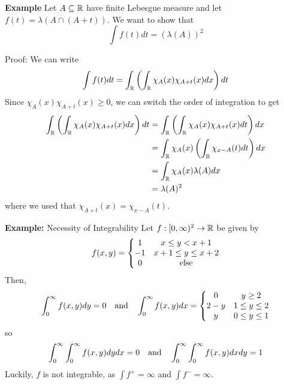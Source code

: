 \begin{example}{\textbf{Example}}
    Let $A \subseteq \R$ have finite Lebesgue measure and let $f(t) = \lambda(A \cap (A + t))$. We want to show that
    \[ \int f(t) dt = (\lambda(A))^2 \]
\end{example}
\begin{solution}{Proof:}
    We can write
    \[ \int f(t) dt = \int_{\R} \left(\int_{\R} \chi_{A}(x)\chi_{A + t}(x) dx\right) dt \]
    Since $\chi_{A}(x)\chi_{A + t}(x) \geq 0$, we can switch the order of integration to get
    \begin{align*}
        \int_{\R} \left(\int_{\R} \chi_{A}(x)\chi_{A + t}(x) dx\right) dt &= \int_{\R} \left(\int_{\R} \chi_{A}(x)\chi_{A + t}(x) dt\right) dx\\
        &= \int_{\R} \chi_{A}(x)\left(\int_{\R} \chi_{x - A}(t) dt\right) dx\\
        &= \int_{\R} \chi_{A}(x)\lambda(A) dx\\
        &= \lambda(A)^2
    \end{align*}
    where we used that $\chi_{A + t}(x) = \chi_{x - A}(t)$. 
\end{solution}

\begin{example}{\textbf{Example:} Necessity of Integrability}
    Let $f : [0, \infty)^2 \to \R$ be given by
    \[ f(x, y) = \left\{\begin{matrix} 1 & x \leq y < x + 1 \\ -1 & x + 1 \leq y \leq x + 2 \\ 0 & \tt{else} \end{matrix}\right. \]
    Then,
    \[ \int_{0}^{\infty} f(x, y) dy = 0 \quand \int_{0}^{\infty} f(x, y) dx = \left\{\begin{matrix} 0 & y \geq 2 \\ 2 - y & 1 \leq y \leq 2 \\ y & 0 \leq y \leq 1 \end{matrix}\right. \]
    so
    \[ \int_{0}^{\infty}\int_{0}^{\infty} f(x, y) dy dx = 0 \quand \int_{0}^{\infty}\int_{0}^{\infty} f(x, y) dx dy = 1 \]
    Luckily, $f$ is not integrable, as $\int f^{+} = \infty$ and $\int f^{-} = \infty$.
\end{example}
